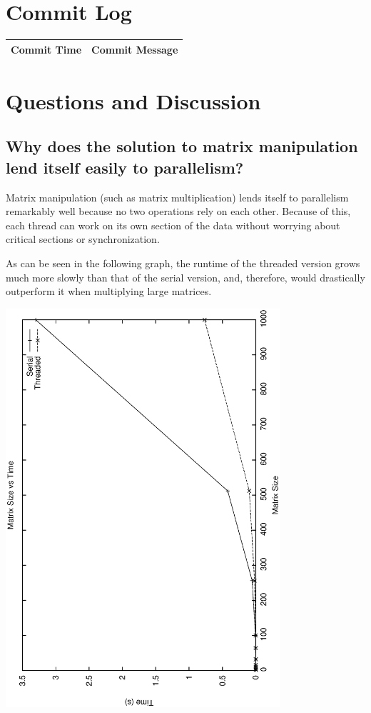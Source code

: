 \documentclass[letterpaper,10pt,titlepage]{article}
\begin{document}
\vfill\break

\section{Commit Log}

\begin{tabular}{ | p{2in} | p{4in} | }
	\hline
	Commit Time & Commit Message \\ \hline
	
\end{tabular}

\section{Questions and Discussion}

\subsection{Why does the solution to matrix manipulation lend itself easily to parallelism?}
Matrix manipulation (such as matrix multiplication) lends itself to parallelism remarkably
well because no two operations rely on each other. Because of this, each thread can work
on its own section of the data without worrying about critical sections or synchronization. 

As can be seen in the following graph, the runtime of the threaded version grows
much more slowly than that of the serial version, and, therefore, would drastically
outperform it when multiplying large matrices.

\includegraphics[width=4in, angle=270]{size_graph.eps}
\end{document}
